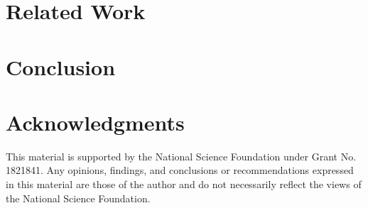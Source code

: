 \documentclass[a4paper,twoside]{article}
\begin{document}
\section{Related Work}
\label{sec:related}


\section{Conclusion}
\label{sec:concl}


\section{Acknowledgments}
\noindent This material is supported by the National Science Foundation under Grant No. 1821841. Any
opinions, findings, and conclusions or recommendations expressed in this material are those of the author and do not necessarily reflect the views of the National Science Foundation.


{\small
}
\end{document}
